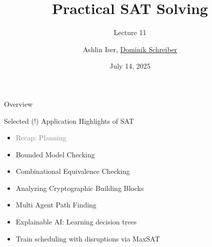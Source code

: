 \documentclass[t,english]{sdqbeamer}
\title{Practical SAT Solving}
\subtitle{Lecture 11 \unimp{\normalfont -- Application Highlights}}
\author{{Ashlin Iser}, \underline{Dominik Schreiber}}
\date{July 14, 2025}
\begin{document}
\begin{frame}[title white horizontal, picture=logos/blender-render, kitlogo=rgb]
	\titlepage
\end{frame}







\begin{frame}{Overview}
	\begin{blueblock}{Selected (!) Application Highlights of SAT}
	\begin{itemize}
		\item \textcolor{gray}{Recap: Planning}
		\item Bounded Model Checking
		\item Combinational Equivalence Checking
		\item Analyzing Cryptographic Building Blocks
		\item Multi Agent Path Finding
		\item Explainable AI: Learning decision trees
		\item Train scheduling with disruptions via MaxSAT
	\end{itemize}
	\end{blueblock}
\end{frame}
\end{document}
